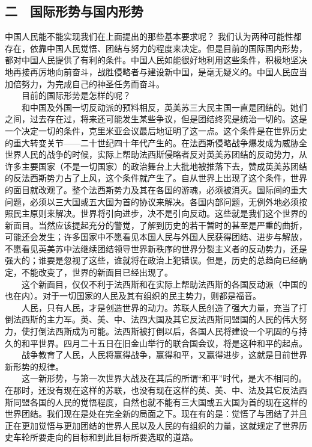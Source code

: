 \documentclass[cn,11pt,chinese]{elegantbook}
\def\myformat#1{\hfil\hfil #1}
\begin{document}
\subsection*{\myformat{二　国际形势与国内形势}}
中国人民能不能实现我们在上面提出的那些基本要求呢？ 我们认为两种可能性都存在，依靠中国人民觉悟、团结与努力的程度来决定。但是目前的国际国内形势，都对中国人民提供了有利的条件。中国人民如能很好地利用这些条件，积极地坚决地再接再厉地向前奋斗，战胜侵略者与建设新中国，是毫无疑义的。中国人民应当加倍努力，为完成自己的神圣任务而奋斗。\\
　　目前的国际形势是怎样的呢？\\
　　和中国及外国一切反动派的预料相反，英美苏三大民主国一直是团结的。她们之间，过去存在过，将来还可能发生某些争议，但是团结终究是统治一切的。这是一个决定一切的条件，克里米亚会议最后地证明了这一点。这个条件是在世界历史的重大转变关节——二十世纪四十年代产生的。在法西斯侵略战争爆发成为威胁全世界人民的战争的时候，实际上帮助法西斯侵略者反对英美苏团结的反动势力，从许多主要国家（不是一切国家）的政治舞台上大批地被推落下去，赞成英美苏团结的反法西斯势力占了上风，这个条件就产生了。自从世界上出现了这个条件，世界的面目就改观了。整个法西斯势力及其在各国的游魂，必须被消灭。国际间的重大问题，必须以三大国或五大国为首的协议来解决。各国内部问题，无例外地必须按照民主原则来解决。世界将引向进步，决不是引向反动。这些就是我们这个世界的新面目。当然应该提起充分的警觉，了解到历史的若干暂时的甚至是严重的曲折，可能还会发生；许多国家中不愿看见本国人民与外国人民获得团结、进步与解放，不愿看见英美苏中法继续团结领导世界新秩序的世界分裂主义者的反动势力，还是强大的；谁要是忽视了这些，谁就将在政治上犯错误。但是，历史的总趋向已经确定，不能改变了，世界的新面目已经出现了。\\
　　这个新面目，仅仅不利于法西斯和在实际上帮助法西斯的各国反动派（中国的也在内）。对于一切国家的人民及其有组织的民主势力，则都是福音。\\
　　人民，只有人民，才是创造世界的动力。苏联人民创造了强大力量，充当了打倒法西斯的主力军。英、美、中、法四大国及其它反法西斯同盟国的人民的伟大努力，使打倒法西斯成为可能。法西斯被打倒以后，各国人民将建设一个巩固的与持久的和平世界。四月二十五日在旧金山举行的联合国会议，将是这种和平的起点。\\
　　战争教育了人民，人民将赢得战争，赢得和平，又赢得进步，这就是目前世界新形势的规律。\\
　　这一新形势，与第一次世界大战及在其后的所谓“和平”时代，是大不相同的。在那时，还没有现在这样的苏联，也没有现在这样的英、美、中、法及其它反法西斯同盟各国的人民的觉悟程度，自然也就不能有三大国或五大国为首的现在这样的世界团结。我们现在是处在完全新的局面之下。现在有的是：觉悟了与团结了并且正在更加觉悟与更加团结的世界人民以及人民的有组织的力量，这就规定了世界历史车轮所要走向的目标和到此目标所要选取的道路。\\
\end{document}
